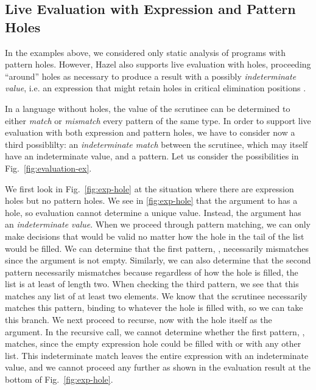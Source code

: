 \subsection{Live Evaluation with Expression and Pattern Holes}
\label{sec:hazel-live-eval}
In the examples above, we considered only {static analysis} of programs with pattern holes.
However, Hazel also supports live evaluation with holes, proceeding ``around'' holes
as necessary to produce a result with a possibly \emph{indeterminate value}, i.e. an expression that might retain holes in critical elimination positions \cite{DBLP:journals/pacmpl/OmarVCH19}.%

In a language without holes, the value of the scrutinee can be determined to either \emph{match} or \emph{mismatch} every pattern of the same type.
In order to support live evaluation with both expression and pattern holes, we have to consider now a third possiblilty: an \emph{indeterminate match} between the scrutinee, which may itself have an indeterminate value, and a pattern. Let us consider the possibilities in Fig.~\ref{fig:evaluation-ex}. 

We first look in Fig.~\ref{fig:exp-hole} at the situation where there are expression holes but no pattern holes. 
We see in \autoref{fig:exp-hole} that the argument to  has a hole, so evaluation cannot determine a unique value. Instead,
the argument has an \emph{indeterminate value}. 
When we proceed through pattern matching, we can only make decisions that would be valid no matter how the hole in the tail of the list
would be filled. 
We can determine that the first pattern, \li{[]}, necessarily mismatches since the argument is not empty. 
Similarly, we can also determine that the second pattern necessarily mismatches because regardless of how the hole is filled, the list is at least of length two. 
When checking the third pattern, we see that this matches any list of at least two elements.
We know that the scrutinee necessarily matches this pattern, binding  to whatever the hole is filled with, so we can take this branch. We next proceed to recurse, now with the hole itself as the argument. In the recursive call, we cannot determine whether the first pattern, \li{[]}, matches, since the empty expression hole could be filled with \li{[]} or with any other list. This indeterminate match leaves the entire  expression with an indeterminate value, and we cannot proceed any further as shown in the
evaluation result at the bottom of Fig.~\ref{fig:exp-hole}.

